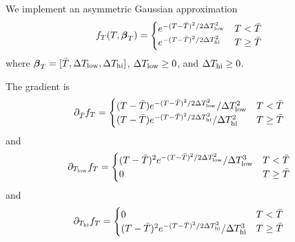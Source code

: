 \documentclass{article}
\newcommand{\bbeta}{\boldsymbol\beta}
\begin{document}
We implement an asymmetric Gaussian approximation
\[
f_T(T, \bbeta_T) =
\begin{cases}
  e^{-(T - \bar{T})^2 / 2 \Delta T_{\rm low}^2} & T < \bar{T} \\
  e^{-(T - \bar{T})^2 / 2 \Delta T_{\rm hi}^2} & T \geq \bar{T}
\end{cases}
\]
where $\bbeta_T = [\bar{T}, \Delta T_{\rm low}, \Delta T_{\rm hi}]$,
$\Delta T_{\rm low} \geq 0$, and
$\Delta T_{\rm hi} \geq 0$.

The gradient is
\[
\partial_{\bar{T}} f_T =
\begin{cases}
  (T - \bar{T})
    e^{-(T - \bar{T})^2 / 2 \Delta T_{\rm low}^2} / \Delta T_{\rm low}^2
    & T < \bar{T} \\
  (T - \bar{T})
    e^{-(T - \bar{T})^2 / 2 \Delta T_{\rm hi}^2} / \Delta T_{\rm hi}^2
    & T \geq \bar{T}
\end{cases}
\]
and
\[
\partial_{T_{\rm low}} f_T =
\begin{cases}
  (T - \bar{T})^2
    e^{-(T - \bar{T})^2 / 2 \Delta T_{\rm low}^2} /
    \Delta T_{\rm low}^3
    & T < \bar{T} \\
  0 & T \geq \bar{T}
\end{cases}
\]
and
\[
\partial_{T_{\rm hi}} f_T =
\begin{cases}
  0 & T < \bar{T} \\
  (T - \bar{T})^2
    e^{-(T - \bar{T})^2 / 2 \Delta T_{\rm hi}^2} / \Delta T_{\rm hi}^3
    & T \geq \bar{T}
\end{cases}
\]


\end{document}
